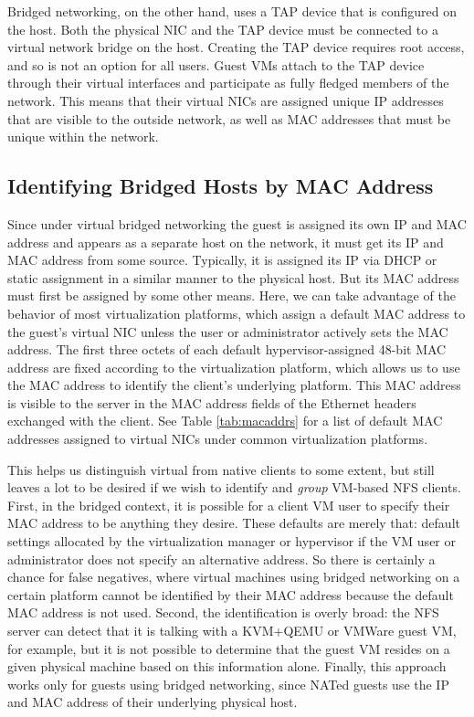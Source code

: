 \documentclass[letterpaper,twocolumn,11pt]{article}
\begin{document}
Bridged networking, on the other hand, uses a TAP device that is configured on the host. Both the physical NIC and the TAP device must be connected to a virtual network bridge on the host. Creating the TAP device requires root access, and so is not an option for all users. Guest VMs attach to the TAP device through their virtual interfaces and participate as fully fledged members of the network. This means that their virtual NICs are assigned unique IP addresses that are visible to the outside network, as well as MAC addresses that must be unique within the network.

\subsection{Identifying Bridged Hosts by MAC Address}
\label{subsec:macaddrs}
Since under virtual bridged networking the guest is assigned its own IP and MAC address and appears as a separate host on the network, it must get its IP and MAC address from some source. Typically, it is assigned its IP via DHCP or static assignment in a similar manner to the physical host. But its MAC address must first be assigned by some other means. Here, we can take advantage of the behavior of most virtualization platforms, which assign a default MAC address to the guest's virtual NIC unless the user or administrator actively sets the MAC address. The first three octets of each default hypervisor-assigned 48-bit MAC address are fixed according to the virtualization platform, which allows us to use the MAC address to identify the client's underlying platform. This MAC address is visible to the server in the MAC address fields of the Ethernet headers exchanged with the client. See Table \ref{tab:macaddrs} for a list of default MAC addresses assigned to virtual NICs under common virtualization platforms. 

This helps us distinguish virtual from native clients to some extent, but still leaves a lot to be desired if we wish to identify and \emph{group} VM-based NFS clients. First, in the bridged context, it is possible for a client VM user to specify their MAC address to be anything they desire. These defaults are merely that: default settings allocated by the virtualization manager or hypervisor if the VM user or administrator does not specify an alternative address. So there is certainly a chance for false negatives, where virtual machines using bridged networking on a certain platform cannot be identified by their MAC address because the default MAC address is not used. Second, the identification is overly broad: the NFS server can detect that it is talking with a KVM+QEMU or VMWare guest VM, for example, but it is not possible to determine that the guest VM resides on a given physical machine based on this information alone. Finally, this approach works only for guests using bridged networking, since NATed guests use the IP and MAC address of their underlying physical host.
\end{document}
